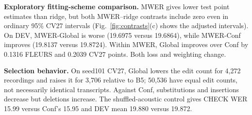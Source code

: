 \noindent\textbf{Exploratory fitting-scheme comparison.} MWER gives lower test point estimates than ridge, but both MWER--ridge contrasts include zero even in ordinary 95\% CV27 intervals (Fig.~\ref{fig:contrasts}(c) shows the adjusted intervals). On DEV, MWER-Global is worse (19.6975 versus 19.6864), while MWER-Conf improves (19.8137 versus 19.8724). Within MWER, Global improves over Conf by 0.1316 FLEURS and 0.2039 CV27 points. Both loss and weighting change.

\noindent\textbf{Selection behavior.} On seed101 CV27, Global lowers the edit count for 4{,}272 recordings and raises it for 3{,}706 relative to B5; 50{,}536 have equal edit counts, not necessarily identical transcripts. Against Conf, substitutions and insertions decrease but deletions increase. The shuffled-acoustic control gives CHECK WER 15.99 versus Conf's 15.95 and DEV mean 19.880 versus 19.872.

